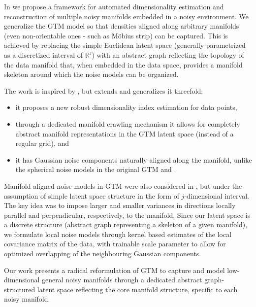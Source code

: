 In \citet{Canducci2021} we propose a framework for automated dimensionality estimation and reconstruction 
of multiple noisy manifolds embedded in a noisy environment.
We generalize the GTM model so that densities aligned along arbitrary manifolds
(even non-orientable ones - such as M\"{o}bius strip) can be captured.
This is achieved by replacing the simple Euclidean latent space (generally parametrized as a discretized interval of $\mathbb{R}^j$)
with an abstract graph reflecting the topology of the data manifold that, when embedded in the data space,
provides a manifold skeleton around which the noise models can be organized.

The work is inspired by \cite{10.1007/978-3-540-87481-2_37}, but extends and generalizes it threefold: 
\begin{itemize}
 \item it proposes a new robust dimensionality index estimation for data points,
 \item through a dedicated manifold crawling mechanism it allows for completely abstract manifold representations in the GTM latent space (instead of a regular grid), and
 \item it has Gaussian noise components naturally aligned along the manifold, unlike the spherical noise models in the original GTM and \cite{10.1007/978-3-540-87481-2_37}.
\end{itemize}
Manifold aligned noise models in GTM were also considered in \cite{Bishop1998DevelopmentsOT},
but under the assumption of simple latent space structure in the form of $j$-dimensional interval.
The key idea was to impose larger and smaller variances in directions locally parallel and perpendicular, respectively, to the manifold.
Since our latent space is a discrete structure (abstract graph representing a skeleton of a given manifold),
we formulate local noise models through kernel based estimates of the local covariance matrix of the data,
with trainable scale parameter to allow for optimized overlapping of the neighbouring Gaussian components. 

Our work presents a radical reformulation of GTM to capture and model low-dimensional general noisy manifolds
through a dedicated abstract graph-structured latent space reflecting the core manifold structure, specific to each noisy manifold.

